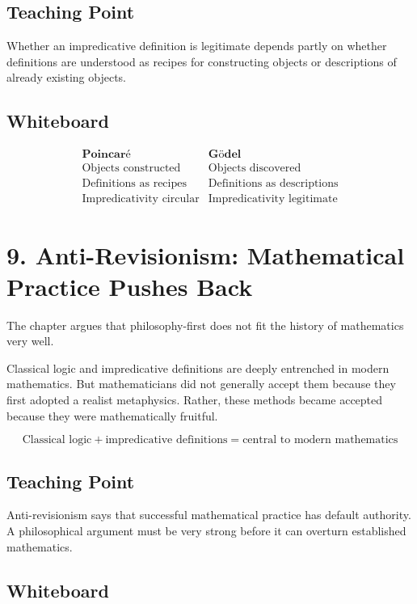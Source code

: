 \documentclass[11pt]{article}
\begin{document}
\subsection*{Teaching Point}

Whether an impredicative definition is legitimate depends partly on whether definitions are
understood as recipes for constructing objects or descriptions of already existing objects.

\subsection*{Whiteboard}

\[
\begin{array}{c|c}
\textbf{Poincar\'e} & \textbf{G\"odel} \\
\hline
\text{Objects constructed} & \text{Objects discovered} \\
\text{Definitions as recipes} & \text{Definitions as descriptions} \\
\text{Impredicativity circular} & \text{Impredicativity legitimate}
\end{array}
\]

\section*{9. Anti-Revisionism: Mathematical Practice Pushes Back}

The chapter argues that philosophy-first does not fit the history of mathematics very well.

Classical logic and impredicative definitions are deeply entrenched in modern mathematics.
But mathematicians did not generally accept them because they first adopted a realist
metaphysics. Rather, these methods became accepted because they were mathematically
fruitful.

\[
\text{Classical logic}
+
\text{impredicative definitions}
=
\text{central to modern mathematics}
\]

\subsection*{Teaching Point}

Anti-revisionism says that successful mathematical practice has default authority. A
philosophical argument must be very strong before it can overturn established mathematics.

\subsection*{Whiteboard}
\end{document}
